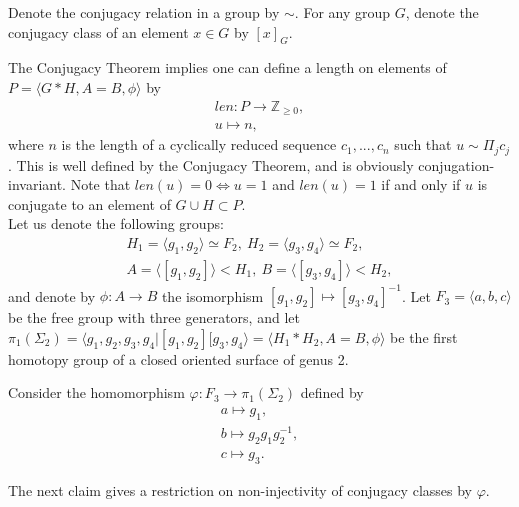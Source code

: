\documentclass[11pt]{article}
\newenvironment{myequation}
    {
        \begin{equation*}
        \begin{gathered}
    }
    { 
        \end{gathered} 
        \end{equation*}
    }
\newcommand{\Z}{\mathbb{Z}}
\begin{document}
    Denote the conjugacy relation in a group by $\sim$. For any group $G$, denote the conjugacy class of an element $x \in G$ by $[x]_G$.

    The Conjugacy Theorem implies one can define a length on elements of $P = \langle G*H , A=B, \phi \rangle$ by
    \begin{myequation}
        len: P \to \Z_{\geq 0} ,\\
        u \mapsto n ,
    \end{myequation}
    where $n$ is the length of a cyclically reduced sequence $c_1,...,c_n$ such that $u \sim \Pi_j c_j$. This is well defined by the Conjugacy Theorem, and is obviously conjugation-invariant. Note that $len(u) = 0 \iff u = 1$ and $len(u) = 1$ if and only if $u$ is conjugate to an element of $G \cup H \subset P$. \\
    
    Let us denote the following groups:
    \begin{myequation}
        H_1 = \langle g_1, g_2 \rangle \simeq F_2 , \ H_2 = \langle g_3, g_4 \rangle \simeq F_2 ,\\
        A = \langle [g_1,g_2] \rangle < H_1 , \ B = \langle [g_3,g_4] \rangle < H_2 ,
    \end{myequation}
    and denote by $\phi: A \to B$ the isomorphism $[g_1,g_2] \mapsto [g_3,g_4]^{-1}$. Let $F_3 = \langle a,b,c \rangle$ be the free group with three generators, and let $\pi_1(\Sigma_2) = \langle g_1,g_2,g_3,g_4 | [g_1,g_2][g_3,g_4 \rangle = \langle H_1 * H_2, A = B, \phi \rangle$ be the first homotopy group of a closed oriented surface of genus 2.
    
    Consider the homomorphism $\varphi: F_3 \to \pi_1(\Sigma_2)$ defined by
    \begin{myequation}
        a \mapsto g_1 ,\\
        b \mapsto g_2 g_1 g_2^{-1} ,\\
        c \mapsto g_3 .
    \end{myequation}
    
    The next claim gives a restriction on non-injectivity of conjugacy classes by $\varphi$.
    
\end{document}
